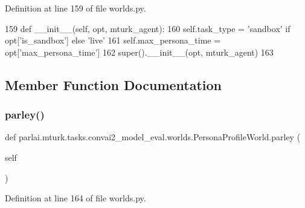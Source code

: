 Definition at line 159 of file worlds.\+py.


\begin{DoxyCode}
159     \textcolor{keyword}{def }\_\_init\_\_(self, opt, mturk\_agent):
160         self.task\_type = \textcolor{stringliteral}{'sandbox'} \textcolor{keywordflow}{if} opt[\textcolor{stringliteral}{'is\_sandbox'}] \textcolor{keywordflow}{else} \textcolor{stringliteral}{'live'}
161         self.max\_persona\_time = opt[\textcolor{stringliteral}{'max\_persona\_time'}]
162         super().\_\_init\_\_(opt, mturk\_agent)
163 
\end{DoxyCode}


\subsection{Member Function Documentation}
\mbox{\label{classparlai_1_1mturk_1_1tasks_1_1convai2__model__eval_1_1worlds_1_1PersonaProfileWorld_a739d128400ec5208820aec46d0b33492}} 
\subsubsection{\texorpdfstring{parley()}{parley()}}
{\footnotesize\ttfamily def parlai.\+mturk.\+tasks.\+convai2\+\_\+model\+\_\+eval.\+worlds.\+Persona\+Profile\+World.\+parley (\begin{DoxyParamCaption}\item[{}]{self }\end{DoxyParamCaption})}



Definition at line 164 of file worlds.\+py.



